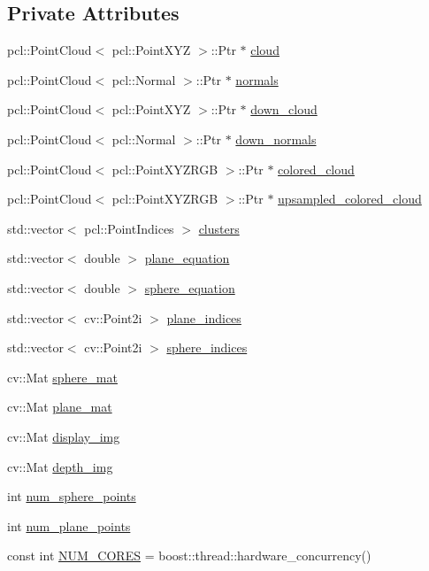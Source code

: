 \subsection*{Private Attributes}
\begin{DoxyCompactItemize}
\item 
pcl\+::\+Point\+Cloud$<$ pcl\+::\+Point\+X\+YZ $>$\+::Ptr $\ast$ \hyperlink{class_plane_a0b493693b28fb0cc74549fa24ded3721}{cloud}
\item 
pcl\+::\+Point\+Cloud$<$ pcl\+::\+Normal $>$\+::Ptr $\ast$ \hyperlink{class_plane_a28e30d6c24eaa6c4e1d57ea8c1a2d924}{normals}
\item 
pcl\+::\+Point\+Cloud$<$ pcl\+::\+Point\+X\+YZ $>$\+::Ptr $\ast$ \hyperlink{class_plane_ae4198f097fe1b58f10068f7bc0962c8c}{down\+\_\+cloud}
\item 
pcl\+::\+Point\+Cloud$<$ pcl\+::\+Normal $>$\+::Ptr $\ast$ \hyperlink{class_plane_aa76fc2b11042a6681c4573159d4fb384}{down\+\_\+normals}
\item 
pcl\+::\+Point\+Cloud$<$ pcl\+::\+Point\+X\+Y\+Z\+R\+GB $>$\+::Ptr $\ast$ \hyperlink{class_plane_a43513b679c313917824fce91b50f8d32}{colored\+\_\+cloud}
\item 
pcl\+::\+Point\+Cloud$<$ pcl\+::\+Point\+X\+Y\+Z\+R\+GB $>$\+::Ptr $\ast$ \hyperlink{class_plane_a65a1a3e2e6eededc01baaa24b7bc7c6c}{upsampled\+\_\+colored\+\_\+cloud}
\item 
std\+::vector$<$ pcl\+::\+Point\+Indices $>$ \hyperlink{class_plane_abd24055f6ac0b57fc3f36462f50175d8}{clusters}
\item 
std\+::vector$<$ double $>$ \hyperlink{class_plane_afdf256b7ed2934c1dca9a09beb8c483e}{plane\+\_\+equation}
\item 
std\+::vector$<$ double $>$ \hyperlink{class_plane_aa8d9403da437be0c087354a8c891afcd}{sphere\+\_\+equation}
\item 
std\+::vector$<$ cv\+::\+Point2i $>$ \hyperlink{class_plane_a5efd74ec0c24a0cac7778705d6134452}{plane\+\_\+indices}
\item 
std\+::vector$<$ cv\+::\+Point2i $>$ \hyperlink{class_plane_a94247ab1ed3d194702250a3a98643212}{sphere\+\_\+indices}
\item 
cv\+::\+Mat \hyperlink{class_plane_a1a9bdfcd38d9113a83ef12132570eff5}{sphere\+\_\+mat}
\item 
cv\+::\+Mat \hyperlink{class_plane_a79bafd16d43b07fd7db7ed942e285109}{plane\+\_\+mat}
\item 
cv\+::\+Mat \hyperlink{class_plane_a08043629802a4740847a526b16ddc0b1}{display\+\_\+img}
\item 
cv\+::\+Mat \hyperlink{class_plane_a90280649d43c66562919b463054387e7}{depth\+\_\+img}
\item 
int \hyperlink{class_plane_a3a7e69fb4f98c716cb403be89beded4c}{num\+\_\+sphere\+\_\+points}
\item 
int \hyperlink{class_plane_a59841c6147cdc9a25d7f6d9669ff6fd2}{num\+\_\+plane\+\_\+points}
\item 
const int \hyperlink{class_plane_abc9e342c010c172faf22b345f68f25bd}{N\+U\+M\+\_\+\+C\+O\+R\+ES} = boost\+::thread\+::hardware\+\_\+concurrency()
\end{DoxyCompactItemize}


